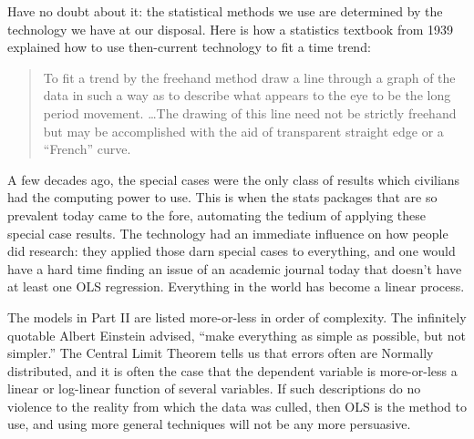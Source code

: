 Have no doubt about it: the statistical methods we use are determined by
the technology we have at our disposal. Here is how a statistics textbook from 1939
\citep[p 43]{arkin:colton} explained how to use then-current technology to fit
a time trend:
\begin{quote}
To fit a trend by the freehand method draw a line through a graph of
the data in such a way as to describe what
appears to the eye to be the long period movement. \dots The drawing of
this line need not be strictly freehand but
may be accomplished with the aid of transparent straight edge or a
``French'' curve.
\end{quote}

A few decades ago, the special cases were the only class of results which
civilians had the computing power to use. This is when the stats packages
that are so prevalent today came to the fore, automating the tedium of
applying these special case results. The technology had an immediate
influence on how people did research: they applied those darn special
cases to everything, and one would have a hard time finding an issue of an
academic journal today that doesn't have at least one OLS regression.
Everything in the world has become a linear process.



The models in Part II are listed more-or-less in order of complexity.
The infinitely quotable Albert Einstein advised, ``make everything as
simple as possible, but not simpler.''  
The Central Limit Theorem tells us that errors often are
Normally distributed, and it is often the case that the dependent
variable is more-or-less a linear or log-linear function of several
variables. If such descriptions do no violence to the reality from
which the data was culled, then OLS is the method to use, and using more
general techniques will not be any more persuasive. 

